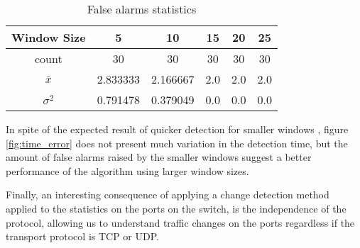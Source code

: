 \begin{table}[H]
    \centering
    \caption{False alarms statistics}
    \label{tab:false_alarms}
    \begin{tabular}{|c|c|c|c|c|c|}
        \hline
        Window Size   & 5        & 10       & 15  & 20  & 25  \\ \hline
        count         & 30       & 30       & 30  & 30  & 30  \\ \hline
        $\bar{x}$            & 2.833333 & 2.166667 & 2.0 & 2.0 & 2.0 \\ \hline
        $\sigma^2$& 0.791478 & 0.379049 & 0.0 & 0.0 & 0.0 \\ \hline
    \end{tabular}
\end{table}

\par In spite of the expected result of quicker detection for smaller windows \cite{choudhary_runtime-efficacy_2017}, figure \ref{fig:time_error} does not present 
much variation in the detection time, but the amount of false alarms raised by the smaller windows suggest a better performance of the algorithm using larger 
window sizes.

\par Finally, an interesting consequence of applying a change detection method applied to the statistics on the ports on the switch, is the independence of the 
protocol, allowing us to understand traffic changes on the ports regardless if the transport protocol is TCP or UDP.
